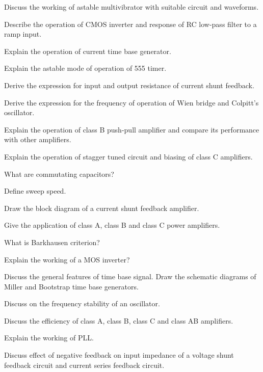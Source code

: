 \item Discuss the working of astable multivibrator with suitable circuit
  and waveforms.
\Or
\item Describe the operation of CMOS inverter and response of RC low-pass
  filter to a ramp input.

\newpage \again

\item Explain the operation of current time base generator.
\Or
\item Explain the astable mode of operation of 555 timer.

\item Derive the expression for input and output resistance of current
  shunt feedback.
\Or
\item Derive the expression for the frequency of operation of Wien bridge
  and Colpitt's oscillator.

\item Explain the operation of class B push-pull amplifier and compare
  its performance with other amplifiers.
\Or
\item Explain the operation of stagger tuned circuit and biasing of
  class C amplifiers.

\ene
\markC

\newpage

\sub{\subj}
\maxtime

\partA

\iitem What are commutating capacitors?
\item Define sweep speed.
\item Draw the block diagram of a current shunt feedback amplifier.
\item Give the application of class A, class B and class C power amplifiers.
\item What is Barkhausen criterion?

\markA 
\partB

\item Explain the working of a MOS inverter?
\item Discuss the general features of time base signal. Draw the schematic diagrams
  of Miller and Bootstrap time base generators.
\item Discuss on the frequency stability of an oscillator.
\item Discuss the efficiency of class A, class B, class C and class AB amplifiers.
\item Explain the working of PLL.
\item Discuss effect of negative feedback on input impedance of a voltage shunt feedback circuit
  and current series feedback circuit.

